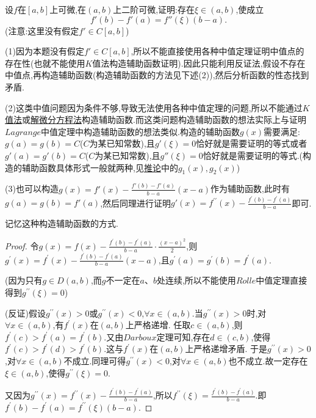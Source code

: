 \documentclass[lang=cn,newtx,10pt,scheme=chinese]{../Template/elegantbook}
\begin{document}
\begin{proposition}\label{pro:Lagrange中值定理的推广(二阶导数)}
    设\(f\)在\([a,b]\)上可微,在\((a,b)\)上二阶可微,证明:存在\(\xi\in(a,b)\),使成立
    \[
    f'(b) - f'(a) = f''(\xi)(b - a).
    \]
    (注意:这里没有假定\(f'\in C[a,b]\))
\end{proposition}
\begin{note}
    (1)因为本题没有假定\(f'\in C[a,b]\),所以不能直接使用各种中值定理证明中值点的存在性(也就不能使用$K$值法构造辅助函数证明).因此只能利用反证法,假设不存在中值点,再构造辅助函数(构造辅助函数的方法见下述(2)),然后分析函数的性态找到矛盾.

    (2)这类中值问题因为条件不够,导致无法使用各种中值定理的问题,所以不能通过\hyperlink{a}{$K$值法}或\hyperlink{a}{解微分方程法}构造辅助函数.而这类问题构造辅助函数的想法实际上与证明$Lagrange$中值定理中构造辅助函数的想法类似.构造的辅助函数$g(x)$需要满足:$g(a)=g(b)=C$($C$为某已知常数),且$g'(\xi)=0$恰好就是需要证明的等式或者$g'(a)=g'(b)=C$($C$为某已知常数),且$g''(\xi)=0$恰好就是需要证明的等式.(构造的辅助函数具体形式一般就两种,见\hyperref[cor:Lagrange中值定理的推广(k+1阶导数)]{推论}中的$g_1(x),g_2(x)$)

    (3)也可以构造$g\left( x \right) =f'\left( x \right) -\frac{f'\left( b \right) -f'\left( a \right)}{b-a}\left( x-a \right)$作为辅助函数,此时有$g(a)=g(b)=f'(a)$,然后同理进行证明$g'(x)=f^{\prime\prime}(x) - \frac{f^{\prime}(b) - f^{\prime}(a)}{b - a}$即可.
\end{note}
\begin{remark}
    记忆这种构造辅助函数的方式.
\end{remark}
\begin{proof}\label{proof:Lagrange中值定理的推广(二阶导数)-证明}
    令\(g(x) = f(x) - \frac{f^{\prime}(b) - f^{\prime}(a)}{b - a} \cdot \frac{(x - a)^2}{2}\),则\(g^{\prime}(x) = f^{\prime}(x) - \frac{f^{\prime}(b) - f^{\prime}(a)}{b - a}(x - a)\),且\(g^{\prime}(a) = g^{\prime}(b) = f^{\prime}(a)\).

(因为只有\(g\in D(a,b)\),而\(g\)不一定在\(a\)、\(b\)处连续,所以不能使用\(Rolle\)中值定理直接得到\(g^{\prime\prime}(\xi) = 0\))

(反证)假设\(g^{\prime\prime}(x) > 0\)或\(g^{\prime\prime}(x) < 0\),\(\forall x\in (a,b)\).当\(g^{\prime\prime}(x) > 0\)时,对\(\forall x\in (a,b)\),有\(f^{\prime}(x)\)在\((a,b)\)上严格递增.
任取\(c\in (a,b)\),则\(f^{\prime}(c) > f^{\prime}(a) = f^{\prime}(b)\).又由\(Darboux\)定理可知,存在\(d\in (c,b)\),使得\(f^{\prime}(c) > f^{\prime}(d) > f^{\prime}(b)\).这与\(f^{\prime}(x)\)在\((a,b)\)上严格递增矛盾.
于是\(g^{\prime\prime}(x) > 0\),对\(\forall x\in (a,b)\)不成立.同理可得\(g^{\prime\prime}(x) < 0\),对\(\forall x\in (a,b)\)也不成立.故一定存在\(\xi \in (a,b)\),使得\(g^{\prime\prime}(\xi) = 0\).

又因为\(g^{\prime\prime}(x) = f^{\prime\prime}(x) - \frac{f^{\prime}(b) - f^{\prime}(a)}{b - a}\),所以\(f^{\prime\prime}(\xi) = \frac{f^{\prime}(b) - f^{\prime}(a)}{b - a}\).即\(f^{\prime}(b) - f^{\prime}(a) = f^{\prime\prime}(\xi)(b - a)\).
\end{proof}
\end{document}
